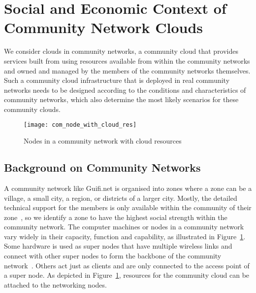 

\section{Social and Economic Context of Community Network Clouds}
\label{sec:community-networks-scenarios}

We consider clouds in community networks, a community cloud that provides services built from using resources available from within the community networks and owned and managed by the members of the community networks themselves.
Such a community cloud infrastructure that is deployed in real community networks needs to be designed according to the conditions and characteristics of community networks, which also determine the most likely scenarios for these community clouds.

\begin{figure}[tbp]
   \centering
   \texttt{[image: com\_node\_with\_cloud\_res]}
   \caption{Nodes in a community network with cloud resources}
   \label{fig:community-network}
\end{figure} 

\subsection{Background on Community Networks}
A community network like Guifi.net is organised into zones where a zone can be a village, a small city, a region, or districts of a larger city.
Mostly, the detailed technical support for the members is only available within the community of their zone~\cite{Vega2012}, so we identify a zone to have the highest social strength within the community network.
The computer machines or nodes in a community network vary widely in their capacity, function and capability, as illustrated in Figure~\ref{fig:community-network}.
Some hardware is used as super nodes that have multiple wireless links and connect with other super nodes to form the backbone of the community network~\cite{Vega2012}.
Others act just as clients and are only connected to the access point of a super node. 
As depicted in Figure~\ref{fig:community-network}, resources for the community cloud can be attached to the networking nodes.

